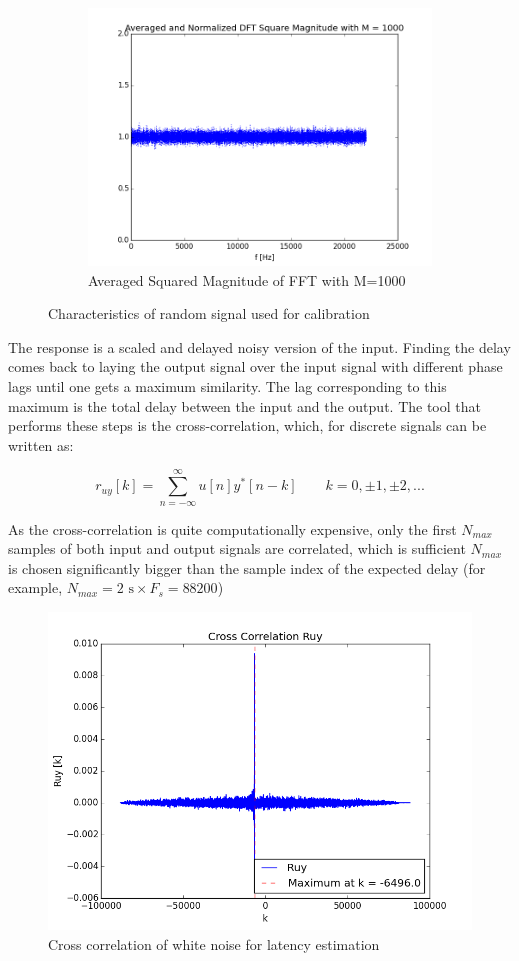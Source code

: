 \begin{figure}[H]
\begin{subfigure}[b]{0.49\linewidth}
        \includegraphics[width=\linewidth]{files/random_M1000.png}
        \caption{Averaged Squared Magnitude of FFT with M=1000}
        \label{fig:random_M1000}
    \end{subfigure}
	\caption{Characteristics of random signal used for calibration} 
	\label{fig:random}
\end{figure}
The response is a scaled and delayed noisy version of the input. Finding the delay comes back to laying the output signal over the input signal with different phase lags until one gets a maximum similarity. The lag corresponding to this maximum is the total delay between the input and the output. The tool that performs these steps is the cross-correlation, which, for discrete signals can be written as: 

\begin{equation}
	r_{uy}[k] = \sum\limits_{n=-\infty}^{\infty} u[n]y^*[n-k] \hspace{2em} k=0,\pm1,\pm2,...
\end{equation}

As the cross-correlation is quite computationally expensive, only the first $N_{max}$ samples of both input and output signals are correlated, which is sufficient $N_{max}$ is chosen significantly bigger than the sample index of the expected delay (for example, $N_{max}=2  \text{ s} \times F_s = 88200$)

\begin{figure}[H]
	\centering
	\includegraphics[width=0.6\linewidth]{files/audio_ruy.png}
	\caption{Cross correlation of white noise for latency estimation}
	\label{fig:audio_ruy}
\end{figure}


